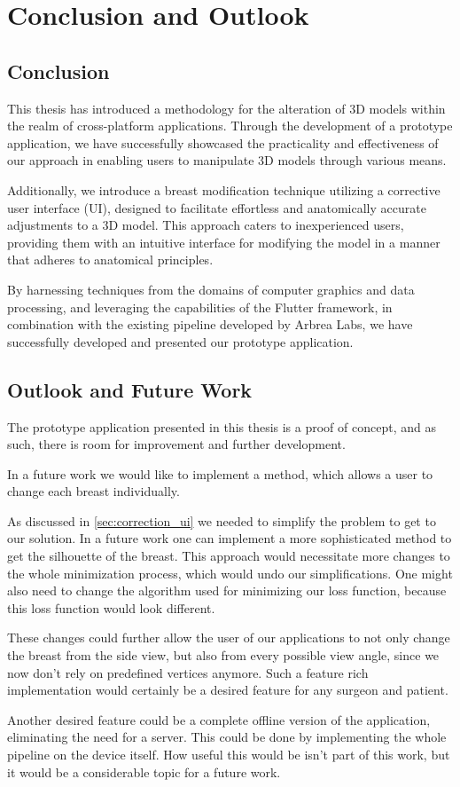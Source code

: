 \chapter{Conclusion and Outlook}\label{ch05-conclusion-and-outlook}

\section{Conclusion}

This thesis has introduced a methodology for the alteration of 3D models within the realm of cross-platform applications. Through the development of a prototype application, 
we have successfully showcased the practicality and effectiveness of our approach in enabling users to manipulate 3D models through various means.

Additionally, we introduce a breast modification technique utilizing a corrective user interface (UI), designed to facilitate effortless and anatomically accurate adjustments 
to a 3D model. This approach caters to inexperienced users, providing them with an intuitive interface for modifying the model in a manner that adheres to anatomical principles.

By harnessing techniques from the domains of computer graphics and data processing, and leveraging the capabilities of the Flutter framework, in combination with the existing 
pipeline developed by Arbrea Labs, we have successfully developed and presented our prototype application.

\section{Outlook and Future Work}\label{sec:future_work}

The prototype application presented in this thesis is a proof of concept, and as such, there is room for improvement and further development. 

In a future work we would like to implement a method, which allows a user to change each breast individually.

As discussed in \ref{sec:correction_ui} we needed to simplify the problem to get to our solution. In a future work one can implement a more sophisticated method to get the silhouette of the breast.
This approach would necessitate more changes to the whole minimization process, which would undo our simplifications. One might also need to change the algorithm used for minimizing our loss function, because
this loss function would look different.

These changes could further allow the user of our applications to not only change the breast from the side view, but also from every possible view angle, since we now don't rely on predefined vertices anymore.
Such a feature rich implementation would certainly be a desired feature for any surgeon and patient.

Another desired feature could be a complete offline version of the application, eliminating the need for a server. This could be done by implementing the whole pipeline on the device itself.
How useful this would be isn't part of this work, but it would be a considerable topic for a future work.


